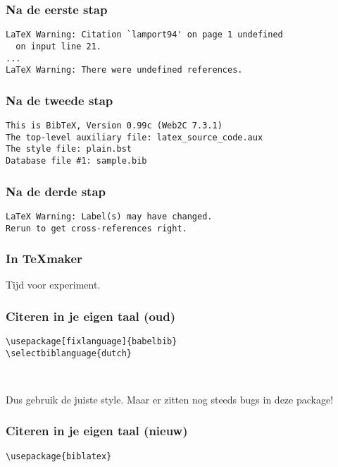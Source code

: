 \begin{frame}[fragile]
  \frametitle{Na de eerste stap}
  \begin{verbatim}
LaTeX Warning: Citation `lamport94' on page 1 undefined
  on input line 21.
...
LaTeX Warning: There were undefined references.\end{verbatim}
\end{frame}

\begin{frame}[fragile]
  \frametitle{Na de tweede stap}
  \begin{verbatim}
This is BibTeX, Version 0.99c (Web2C 7.3.1)
The top-level auxiliary file: latex_source_code.aux
The style file: plain.bst
Database file #1: sample.bib\end{verbatim}
\end{frame}

\begin{frame}[fragile]
  \frametitle{Na de derde stap}
  \begin{verbatim}
LaTeX Warning: Label(s) may have changed.
Rerun to get cross-references right. 
  \end{verbatim}
\end{frame}

\begin{frame}
  \frametitle{In \TeX maker}

  Tijd voor experiment.
\end{frame}

\begin{frame}[fragile]
  \frametitle{Citeren in je eigen taal (oud)}

  \begin{verbatim}
\usepackage[fixlanguage]{babelbib}
\selectbiblanguage{dutch}



  \end{verbatim}
  Dus gebruik de juiste style. Maar er zitten nog steeds bugs in deze package!
\end{frame}

\begin{frame}[fragile]
  \frametitle{Citeren in je eigen taal (nieuw)}

  \begin{verbatim}
\usepackage{biblatex}


  \end{verbatim}
\end{frame}

